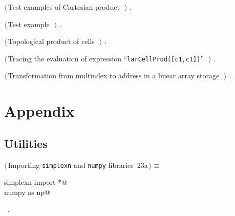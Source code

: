 \documentclass[11pt,oneside]{article}	%
\begin{document}
{\begin{list}{}{\setlength{\itemsep}{-\parsep}\setlength{\itemindent}{-\leftmargin}}
\item $\langle\,$Test examples of Cartesian product\nobreak\ {\footnotesize {}}$\,\rangle$ {\footnotesize {\NWtxtRefIn} .}
\item $\langle\,$Test example\nobreak\ {\footnotesize {}}$\,\rangle$ {\footnotesize {\NWtxtNoRef}.}
\item $\langle\,$Topological product of cells\nobreak\ {\footnotesize {}}$\,\rangle$ {\footnotesize {\NWtxtRefIn} .}
\item $\langle\,$Tracing the evaluation of expression ``\texttt{larCellProd([c1,c1])}''\nobreak\ {\footnotesize {}}$\,\rangle$ {\footnotesize {\NWtxtNoRef}.}
\item $\langle\,$Transformation from multindex to address in a linear array storage\nobreak\ {\footnotesize {}}$\,\rangle$ {\footnotesize {\NWtxtRefIn} .}
\end{list}}

\appendix
\section{Appendix}
\label{sec:utilities}

\subsection{Utilities}

\begin{flushleft} \small
\begin{minipage}{\linewidth} \label{scrap37}
\protect{}$\langle\,$Importing \texttt{simplexn} and \texttt{numpy} libraries\nobreak\ {\footnotesize 23a}$\,\rangle\equiv$
\vspace{-1ex}
\begin{list}{}{} \item
\mbox{}\verb@from simplexn import *@\\
\mbox{}\verb@import numpy as np@\\
\mbox{}\verb@@{\NWsep}
\end{list}
\vspace{-1ex}
\footnotesize\addtolength{\baselineskip}{-1ex}
\begin{list}{}{\setlength{\itemsep}{-\parsep}\setlength{\itemindent}{-\leftmargin}}
\item \NWtxtMacroRefIn\ .
\end{list}
\end{minipage}\\[4ex]
\end{flushleft}
\end{document}
